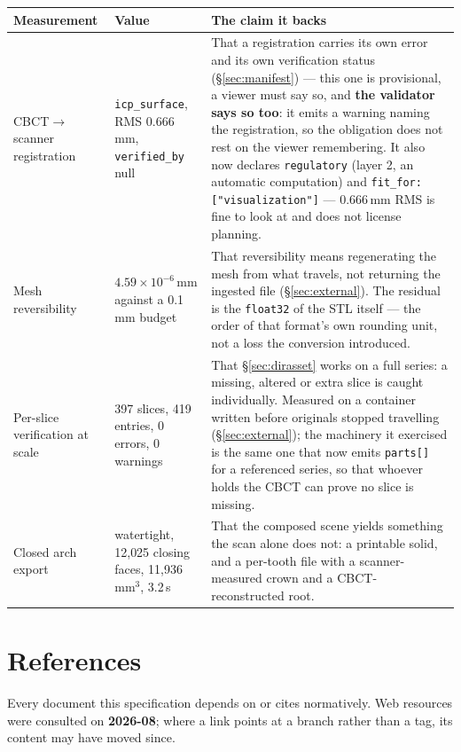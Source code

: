 \documentclass[11pt,a4paper]{article}
\newcommand{\code}[1]{\texttt{\small #1}}
\begin{document}
\begin{longtable}{L{4.6cm} L{4.0cm} L{6.8cm}}
\toprule
\textbf{Measurement} & \textbf{Value} & \textbf{The claim it backs}\\
\midrule
\endhead
CBCT$\to$scanner registration & \code{icp\_surface}, RMS 0.666\,mm, \code{verified\_by}
null & That a registration carries its own error and its own verification status
(\S\ref{sec:manifest}) --- this one is provisional, a viewer must say so, and \textbf{the
validator says so too}: it emits a warning naming the registration, so the obligation does
not rest on the viewer remembering. It also now declares \code{regulatory} (layer 2, an
automatic computation) and \code{fit\_for: ["visualization"]} --- 0.666\,mm RMS is fine to
look at and does not license planning.\\

Mesh reversibility & $4.59\times10^{-6}$\,mm against a 0.1\,mm budget & That reversibility
means regenerating the mesh from what travels, not returning the ingested file
(\S\ref{sec:external}). The residual is the \code{float32} of the STL itself --- the order
of that format's own rounding unit, not a loss the conversion introduced.\\

Per-slice verification at scale & 397 slices, 419 entries, 0 errors, 0 warnings & That
\S\ref{sec:dirasset} works on a full series: a missing, altered or extra slice is caught
individually. Measured on a container written before originals stopped travelling
(\S\ref{sec:external}); the machinery it exercised is the same one that now emits
\code{parts[]} for a referenced series, so that whoever holds the CBCT can prove no slice
is missing.\\

Closed arch export & watertight, 12{,}025 closing faces, 11{,}936\,mm$^3$, 3.2\,s & That
the composed scene yields something the scan alone does not: a printable solid, and a
per-tooth file with a scanner-measured crown and a CBCT-reconstructed root.\\
\bottomrule
\end{longtable}

\section{References}\label{app:refs}

Every document this specification depends on or cites normatively. Web resources were
consulted on \textbf{2026-08}; where a link points at a branch rather than a tag, its
content may have moved since.
\end{document}
